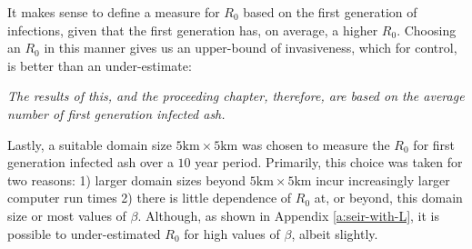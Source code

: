 It makes sense to define a measure for $R_0$ based on the first generation of infections, given that the first generation has, on average, a higher $R_0$. Choosing an $R_0$ in this manner gives us an upper-bound of invasiveness, which for control, is better than an under-estimate:

\textit{The results of this, and the proceeding chapter, therefore, are based on the average number of first generation infected ash.}

Lastly, a suitable domain size $5\mathrm{km} \times 5\mathrm{km}$ was chosen to measure the $R_0$ for first generation infected ash over a $10$ year period. Primarily, this choice was taken for two reasons: 1) larger domain sizes beyond $5\mathrm{km} \times 5\mathrm{km}$ incur increasingly larger computer run times 2) there is little dependence of $R_0$ at, or beyond, this domain size or most values of $\beta$. Although, as shown in Appendix \ref{a:seir-with-L}, it is possible to under-estimated $R_0$ for high values of $\beta$, albeit slightly.








